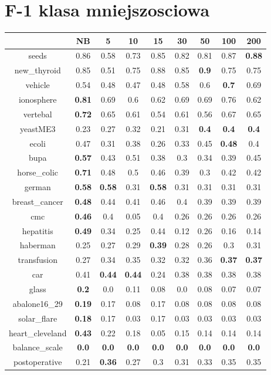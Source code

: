 \documentclass{article}%
\begin{document}
%
\section*{F{-}1 klasa mniejszosciowa}%
\begin{tabular}{c|cccccccc}%
\hline%
&NB&5&10&15&30&50&100&200\\%
\hline%
seeds&0.86&0.58&0.73&0.85&0.82&0.81&0.87&\textbf{0.88}\\%
new\_thyroid&0.85&0.51&0.75&0.88&0.85&\textbf{0.9}&0.75&0.75\\%
vehicle&0.54&0.48&0.47&0.48&0.58&0.6&\textbf{0.7}&0.69\\%
ionosphere&\textbf{0.81}&0.69&0.6&0.62&0.69&0.69&0.76&0.62\\%
vertebal&\textbf{0.72}&0.65&0.61&0.54&0.61&0.56&0.67&0.65\\%
yeastME3&0.23&0.27&0.32&0.21&0.31&\textbf{0.4}&\textbf{0.4}&\textbf{0.4}\\%
ecoli&0.47&0.31&0.38&0.26&0.33&0.45&\textbf{0.48}&0.4\\%
bupa&\textbf{0.57}&0.43&0.51&0.38&0.3&0.34&0.39&0.45\\%
horse\_colic&\textbf{0.71}&0.48&0.5&0.46&0.39&0.3&0.42&0.42\\%
german&\textbf{0.58}&\textbf{0.58}&0.31&\textbf{0.58}&0.31&0.31&0.31&0.31\\%
breast\_cancer&\textbf{0.48}&0.44&0.41&0.46&0.4&0.39&0.39&0.39\\%
cmc&\textbf{0.46}&0.4&0.05&0.4&0.26&0.26&0.26&0.26\\%
hepatitis&\textbf{0.49}&0.34&0.25&0.44&0.12&0.26&0.16&0.14\\%
haberman&0.25&0.27&0.29&\textbf{0.39}&0.28&0.26&0.3&0.31\\%
transfusion&0.27&0.34&0.35&0.32&0.32&0.36&\textbf{0.37}&\textbf{0.37}\\%
car&0.41&\textbf{0.44}&\textbf{0.44}&0.24&0.38&0.38&0.38&0.38\\%
glass&\textbf{0.2}&0.0&0.11&0.08&0.0&0.08&0.07&0.07\\%
abalone16\_29&\textbf{0.19}&0.17&0.08&0.17&0.08&0.08&0.08&0.08\\%
solar\_flare&\textbf{0.18}&0.17&0.03&0.17&0.03&0.03&0.03&0.03\\%
heart\_cleveland&\textbf{0.43}&0.22&0.18&0.05&0.15&0.14&0.14&0.14\\%
balance\_scale&\textbf{0.0}&\textbf{0.0}&\textbf{0.0}&\textbf{0.0}&\textbf{0.0}&\textbf{0.0}&\textbf{0.0}&\textbf{0.0}\\%
postoperative&0.21&\textbf{0.36}&0.27&0.3&0.31&0.33&0.35&0.35\\%
\end{tabular}
\end{document}
